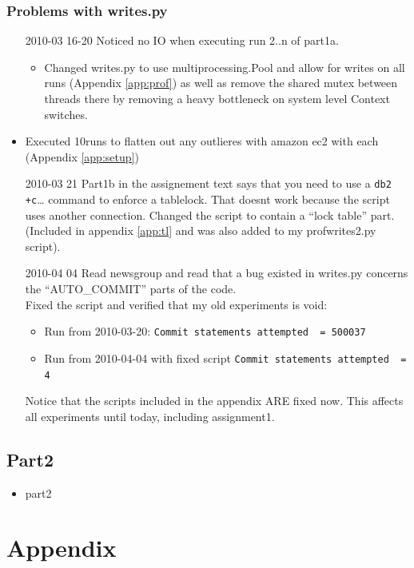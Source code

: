 \subsection{Problems with writes.py}\label{log:probwrite}
\begin{itemize}
  \item[2010-03 16-20] Noticed no IO when executing run 2..n of part1a.
    \begin{itemize}
      \item Changed writes.py to use multiprocessing.Pool and allow for writes on
    all runs (Appendix \ref{app:prof}) as well as remove the shared mutex
    between threads there by removing a heavy bottleneck on system level Context
    switches.
   \end{itemize}
  \item Executed 10runs to flatten out any outlieres with amazon ec2 with each
    (Appendix \ref{app:setup})
  \item[2010-03 21] Part1b in the assignement text says that you need to use a \verb|db2 +c|\ldots
    command to enforce a tablelock. That doesnt work because the script uses
    another connection. Changed the script to contain a ``lock table'' part.
    (Included in appendix \ref{app:tl} and was also added to my profwrites2.py
    script).
  \item[2010-04 04] Read newsgroup and read that a bug existed in writes.py
    concerns the ``AUTO\_COMMIT'' parts of the code.\\
    Fixed the script and verified that my old experiments is void:
    \begin{itemize}
      \item Run from 2010-03-20: \verb|Commit statements attempted  = 500037|
      \item Run from 2010-04-04 with fixed script \verb|Commit statements attempted  = 4|
    \end{itemize}
    Notice that the scripts included in the appendix ARE fixed now. 
    This affects all experiments until today, including assignment1.
\end{itemize}

\section{Part2}
\begin{itemize}
  \item part2
\end{itemize}

\appendix
\chapter{Appendix}
